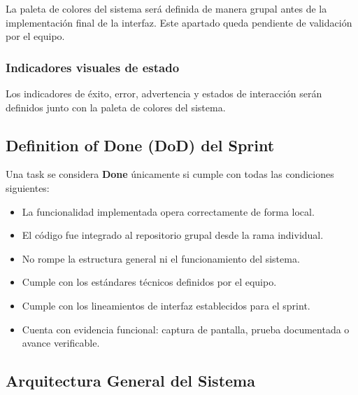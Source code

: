 \documentclass[12pt,a4paper]{article}
\begin{document}

La paleta de colores del sistema será definida de manera grupal antes de la implementación final de la interfaz. Este apartado queda pendiente de validación por el equipo.

\subsubsection*{Indicadores visuales de estado}


Los indicadores de éxito, error, advertencia y estados de interacción serán definidos junto con la paleta de colores del sistema.

\subsection{Definition of Done (DoD) del Sprint}

Una task se considera \textbf{Done} únicamente si cumple con todas las condiciones siguientes:

\begin{itemize}
    \item La funcionalidad implementada opera correctamente de forma local.
    \item El código fue integrado al repositorio grupal desde la rama individual.
    \item No rompe la estructura general ni el funcionamiento del sistema.
    \item Cumple con los estándares técnicos definidos por el equipo.
    \item Cumple con los lineamientos de interfaz establecidos para el sprint.
    \item Cuenta con evidencia funcional: captura de pantalla, prueba documentada o avance verificable.
\end{itemize}

\subsection{Arquitectura General del Sistema}

\end{document}
